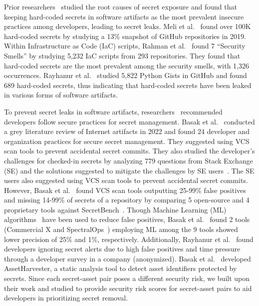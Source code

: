 Prior researchers~\cite{meli2019bad,rahman2019share,rahman2019seven, igibeksecret, rahman2021different, krause2023pushed} studied the root causes of secret exposure and found that keeping hard-coded secrets in software artifacts as the most prevalent insecure practices among developers, leading to secret leaks. Meli et al.~\cite{meli2019bad} found over 100K hard-coded secrets by studying a 13\% snapshot of GitHub repositories in 2019. Within Infrastructure as Code (IaC) scripts, Rahman et al.~\cite{rahman2019seven}  found 7 ``Security Smells'' by studying 5,232 IaC scripts from 293 repositories. They found that hard-coded secrets are the most prevalent among the security smells, with 1,326 occurrences. Rayhanur et al.~\cite{rahman2019share} studied 5,822 Python Gists in GitHub and found 689 hard-coded secrets, thus indicating that hard-coded secrets have been leaked in various forms of software artifacts.

To prevent secret leaks in software artifacts, researchers~\cite{krause2023pushed,basaksecretpractice, basakchallenges} recommended developers follow secure practices for secret management. Basak et al.~\cite{basaksecretpractice} conducted a grey literature review of Internet artifacts in 2022 and found 24 developer and organization practices for secure secret management. They suggested using VCS scan tools to prevent accidental secret commits. They also studied the developer's challenges for checked-in secrets by analyzing 779 questions from Stack Exchange (SE) and the solutions suggested to mitigate the challenges by SE users~\cite{basakchallenges}. The SE users also suggested using VCS scan tools to prevent accidental secret commits. However, Basak et al.~\cite{basak2023compare} found VCS scan tools outputting 25-99\% false positives and missing 14-99\% of secrets of a repository by comparing 5 open-source and 4 proprietary tools against SecretBench~\cite{secretbench}. Though Machine Learning (ML) algorithms~\cite{fengsecret, secrethunter, konygin2023using} have been used to reduce false positives, Basak et al.~\cite{basak2023compare} found 2 tools (Commercial X and SpectralOps~\cite{spectralops}) employing ML among the 9 tools showed lower precision of 25\% and 1\%, respectively. Additionally, Rayhanur et al.~\cite{rahman2022secret} found developers ignoring secret alerts due to high false positives and time pressure through a developer survey in a company (anonymized). Basak et al.~\cite{assetharvester} developed AssetHarvester, a static analysis tool to detect asset identifiers protected by secrets. Since each secret-asset pair poses a different security risk, we built upon their work and studied to provide security risk scores for secret-asset pairs to aid developers in prioritizing secret removal. 